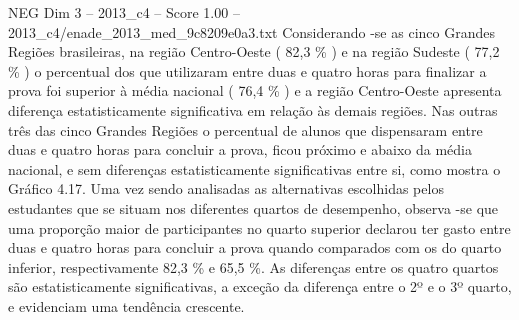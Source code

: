 \begin{textsample}{NEG Dim 3 – 2013\_c4 – Score 1.00 – 2013\_c4/enade\_2013\_med\_9c8209e0a3.txt}
Considerando -se as cinco Grandes Regiões brasileiras, na região Centro-Oeste ( 82,3 \% ) e na região Sudeste ( 77,2 \% ) o percentual dos que utilizaram entre duas e quatro horas para finalizar a prova foi superior à média nacional ( 76,4 \% ) e a região Centro-Oeste apresenta diferença estatisticamente significativa em relação às demais regiões.
Nas outras três das cinco Grandes Regiões o percentual de alunos que dispensaram entre duas e quatro horas para concluir a prova, ficou próximo e abaixo da média nacional, e sem diferenças estatisticamente significativas entre si, como mostra o Gráfico 4.17.
Uma vez sendo analisadas as alternativas escolhidas pelos estudantes que se situam nos diferentes quartos de desempenho, observa -se que uma proporção maior de participantes no quarto superior declarou ter gasto entre duas e quatro horas para concluir a prova quando comparados com os do quarto inferior, respectivamente 82,3 \% e 65,5 \%.
As diferenças entre os quatro quartos são estatisticamente significativas, a exceção da diferença entre o 2º e o 3º quarto, e evidenciam uma tendência crescente.

\end{textsample}
